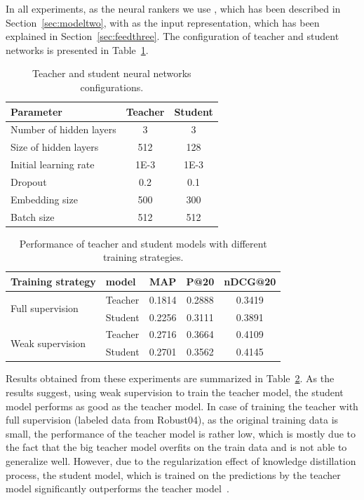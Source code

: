 In all experiments, as the neural rankers we use \modeltwo, which has been described in Section~\ref{sec:modeltwo}, with \Feedthree as the input representation, which has been explained in Section~\ref{sec:feedthree}.  The configuration of teacher and student networks is presented in Table~\ref{tbl:cfg}.
\begin{table}[t]
\centering
\caption{Teacher and student neural networks configurations.}
\begin{tabular}{lcc} 
\toprule
\bf Parameter & \bf Teacher & \bf Student  \\
\midrule
 Number of hidden layers & 3 & 3  \\
 Size of hidden layers & 512 & 128 \\
 Initial learning rate & 1E-3 & 1E-3 \\
 Dropout & 0.2 & 0.1 \\
 Embedding size & 500 & 300 \\
 Batch size & 512 & 512  \\
\bottomrule
\end{tabular}
\label{tbl:cfg}
\end{table}

\begin{table}[t]
\centering
\caption{\label{tbl_res1}Performance of teacher and student models with different training strategies.}
\vspace{5pt}
\begin{adjustbox}{max width=\textwidth}
\begin{tabular}{l l c c c}
\toprule
\bf Training strategy & \bf model & \textbf{MAP} & \textbf{P@20} & \textbf{nDCG@20} 
\\ \midrule
\multirow{2}{*}{{Full supervision}} & {Teacher} 
& 0.1814 & 0.2888 & 0.3419 
\\
& {Student} 
& 0.2256 & 0.3111 & 0.3891 
\\ \midrule
\multirow{2}{*}{{Weak supervision}} & {Teacher} 
& 0.2716 & 0.3664 & 0.4109 
\\ 
& {Student} 
& 0.2701 & 0.3562 & 0.4145 
\\ \bottomrule
\end{tabular}
\end{adjustbox}
\end{table}

Results obtained from these experiments are summarized in Table~\ref{tbl_res1}. As the results suggest, using weak supervision to train the teacher model, the student model performs as good as the teacher model. In case of training the teacher with full supervision (labeled data from Robust04), as the original training data is small, the performance of the teacher model is rather low, which is mostly due to the fact that the big teacher model overfits on the train data and is not able to generalize well. 
However, due to the regularization effect of knowledge distillation process, the student model, which is trained on the predictions by the teacher model significantly outperforms the teacher model~\citep{Hinton:2015,Romero:2014}.

